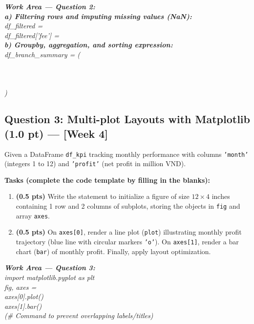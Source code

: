 \documentclass[11pt,a4paper]{article}
\newcommand{\answerbox}[2]{
  \vspace{1mm}
  \begin{tcolorbox}[
    colback=white,
    colframe=gray!60,
    boxrule=0.6pt,
    arc=2pt,
    height=#1,
    left=3mm, right=3mm, top=2mm, bottom=2mm
  ]
  \small\textit{\color{gray}#2}
  \end{tcolorbox}
  \vspace{1mm}
}
\begin{document}
\answerbox{14.0cm}{
\textbf{Work Area --- Question 2:}\\[3mm]
\textbf{a) Filtering rows and imputing missing values (NaN):}\\
df\_filtered = \dotfill\\[4mm]
df\_filtered['fee'] = \dotfill\\[7mm]
\textbf{b) Groupby, aggregation, and sorting expression:}\\
df\_branch\_summary = (\dotfill\\[5mm]
\hspace*{3.5cm}\dotfill\\[5mm]
\hspace*{3.5cm}\dotfill\\[5mm]
\hspace*{3.5cm}\dotfill\\[5mm]
\hspace*{3.5cm}\dotfill)\\[5mm]
\dotfill
}

\newpage
\subsection*{Question 3: Multi-plot Layouts with Matplotlib (1.0 pt) --- [Week 4]}
Given a DataFrame \texttt{df\_kpi} tracking monthly performance with columns \texttt{'month'} (integers 1 to 12) and \texttt{'profit'} (net profit in million VND).

\noindent
\textbf{Tasks (complete the code template by filling in the blanks):}
\begin{enumerate}[label=\textbf{\alph*)}]
  \item \textbf{(0.5 pts)} Write the statement to initialize a figure of size $12 \times 4$ inches containing 1 row and 2 columns of subplots, storing the objects in \texttt{fig} and array \texttt{axes}.
  \item \textbf{(0.5 pts)} On \texttt{axes[0]}, render a line plot (\texttt{plot}) illustrating monthly profit trajectory (blue line with circular markers \texttt{'o'}). On \texttt{axes[1]}, render a bar chart (\texttt{bar}) of monthly profit. Finally, apply layout optimization.
\end{enumerate}

\answerbox{3.8cm}{
\textbf{Work Area --- Question 3:}\\
import matplotlib.pyplot as plt\\[1.5mm]
fig, axes = \dotfill\\[2.5mm]
axes[0].plot(\dotfill)\\[2.5mm]
axes[1].bar(\dotfill)\\[2.5mm]
\dotfill \quad \textit{(\# Command to prevent overlapping labels/titles)}
}
\end{document}
